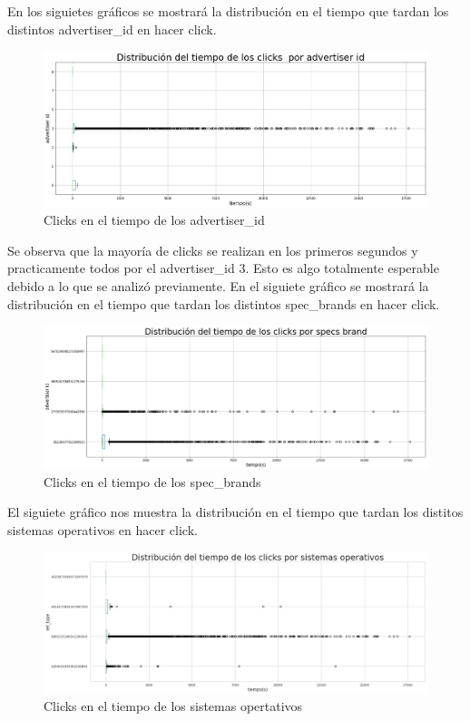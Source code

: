 \documentclass[a4paper, 12pt]{article}
\begin{document}
	
		 En los siguietes gráficos se mostrará la distribución en el tiempo que tardan los distintos advertiser\_id en hacer click.

		\FloatBarrier
		\begin{figure}[h]
			\centering
			\includegraphics[width=\textwidth]{images/clicks/clicks_advertiser_id_timeToTouch.png}
			\caption{Clicks en el tiempo de los advertiser\_id}
		\end{figure}
		\FloatBarrier


		 Se observa que la mayoría de clicks se realizan en los primeros segundos y practicamente todos por el advertiser\_id 3. Esto es algo totalmente esperable debido a lo que se analizó previamente.
		\newline
		\newline
		 En el siguiete gráfico se mostrará la distribución en el tiempo que tardan los distintos spec\_brands en hacer click.

		\FloatBarrier
		\begin{figure}[h]
			\centering
			\includegraphics[width=\textwidth]{images/clicks/clicks_specs_brand_timeToTouch.png}
			\caption{Clicks en el tiempo de los spec\_brands}
		\end{figure}
		\FloatBarrier

		 El siguiete gráfico nos muestra la distribución en el tiempo que tardan los distitos sistemas operativos en hacer click.

		\FloatBarrier
		\begin{figure}[h]
			\centering
			\includegraphics[width=\textwidth]{images/clicks/clicks_ref_type_timeToTouch.png}
			\caption{Clicks en el tiempo de los sistemas opertativos}
		\end{figure}
		\FloatBarrier
\end{document}
